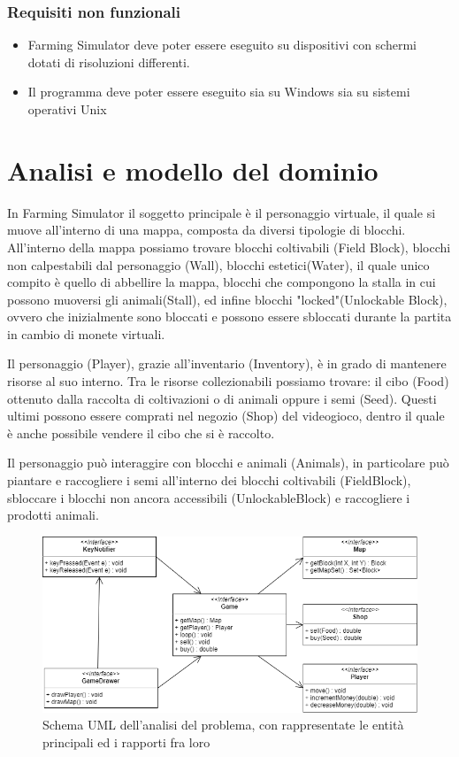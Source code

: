 \documentclass[a4paper,12pt]{report}
\begin{document}
\subsubsection{Requisiti non funzionali}
\begin{itemize}
	\item Farming Simulator deve poter essere eseguito su dispositivi con schermi dotati di risoluzioni differenti.
	\item Il programma deve poter essere eseguito sia su Windows sia su sistemi operativi Unix
\end{itemize}

\hfill\break
\section{Analisi e modello del dominio}

In Farming Simulator il soggetto principale è il personaggio virtuale, il quale si muove all'interno di una mappa, composta da diversi tipologie di blocchi. 
%
All'interno della mappa possiamo trovare blocchi coltivabili (Field Block), blocchi non calpestabili dal personaggio (Wall), blocchi estetici(Water), il quale unico compito è quello di abbellire la mappa, blocchi che compongono la stalla in cui possono muoversi gli animali(Stall), ed infine blocchi "locked"(Unlockable Block), ovvero che inizialmente sono bloccati e possono essere sbloccati durante la partita in cambio di monete virtuali.

Il personaggio (Player), grazie all'inventario (Inventory), è in grado di mantenere risorse al suo interno. Tra le risorse collezionabili possiamo trovare: il cibo (Food) ottenuto dalla raccolta di coltivazioni o di animali oppure i semi (Seed).
Questi ultimi possono essere comprati nel negozio (Shop) del videogioco, dentro il quale è anche possibile vendere il cibo che si è raccolto.

Il personaggio può interaggire con blocchi e animali (Animals), in particolare può piantare e raccogliere i semi all'interno dei blocchi coltivabili (FieldBlock), sbloccare i blocchi non ancora accessibili (UnlockableBlock) e raccogliere i prodotti animali.

\begin{figure}[!htb]
\centerline{\includegraphics[scale=.7]{img/UML_1-1.png}}
\caption{Schema UML dell'analisi del problema, con rappresentate le entità principali ed i rapporti fra loro}
\label{img:analysis}
\end{figure}
\end{document}
